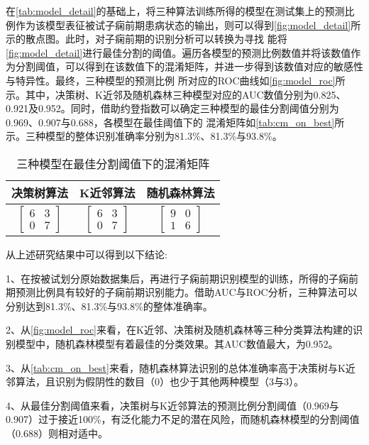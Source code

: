 在\autoref{tab:model_detail}的基础上，将三种算法训练所得的模型在测试集上的预测比例作为该模型表征被试子痫前期患病状态的输出，则可以得到\autoref{fig:model_detail}所示的散点图。此时，对子痫前期的识别分析可以转换为寻找
能将\autoref{fig:model_detail}进行最佳分割的阈值。遍历各模型的预测比例数值并将该数值作为分割阈值，可以得到在该数值下的混淆矩阵，并进一步得到该数值对应的敏感性与特异性。最终，三种模型的预测比例
所对应的ROC曲线如\autoref{fig:model_roc}所示。其中，决策树、K近邻及随机森林三种模型对应的AUC数值分别为0.825、0.921及0.952。同时，借助约登指数可以确定三种模型的最佳分割阈值分别为0.969、0.907与0.688，各模型在最佳阈值下的
混淆矩阵如\autoref{tab:cm_on_best}所示。三种模型的整体识别准确率分别为81.3\%、81.3\%与93.8\%。

\begin{table}[htbp]
      \centering
      \caption{\label{tab:cm_on_best}三种模型在最佳分割阈值下的混淆矩阵}
      \begin{tabular}{ccc}
      \toprule
      \textbf{决策树算法}&\textbf{K近邻算法}&\textbf{随机森林算法}\\
      \midrule
      $\left[ \begin{array}{cc} 6 & 3 \\ 0 & 7 \end{array} \right]$ & $\left[ \begin{array}{cc} 6 & 3 \\ 0 & 7 \end{array} \right]$ & $\left[ \begin{array}{cc} 9 & 0 \\ 1 & 6 \end{array} \right]$ \\
      \bottomrule
      \end{tabular}%
\end{table}%

从上述研究结果中可以得到以下结论:

1、在按被试划分原始数据集后，再进行子痫前期识别模型的训练，所得的子痫前期预测比例具有较好的子痫前期识别能力。借助AUC与ROC分析，三种算法可以分别达到81.3\%、81.3\%与93.8\%的整体准确率。

2、从\autoref{fig:model_roc}来看，在K近邻、决策树及随机森林等三种分类算法构建的识别模型中，随机森林模型有着最佳的分类效果。其AUC数值最大，为0.952。

3、从\autoref{tab:cm_on_best}来看，随机森林算法识别的总体准确率高于决策树与K近邻算法，且识别为假阴性的数目（0）也少于其他两种模型（3与3）。

4、从最佳分割阈值来看，决策树与K近邻算法的预测比例分割阈值（0.969与0.907）过于接近100\%，有泛化能力不足的潜在风险，而随机森林模型的分割阈值（0.688）则相对适中。

